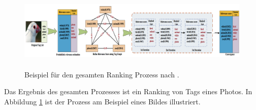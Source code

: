 \begin{figure}[htbp]
  \centering
    \includegraphics[height=1.5in]{images/example_of_random_walk.png}
  \caption{Beispiel für den gesamten Ranking Prozess nach \cite{ranking}.}
  \label{fig:randomWalkExample}
\end{figure}


Das Ergebnis des gesamten Prozesses ist ein Ranking von Tags eines Photos. In Abbildung \ref{fig:randomWalkExample} ist der Prozess am Beispiel eines Bildes illustriert. %





